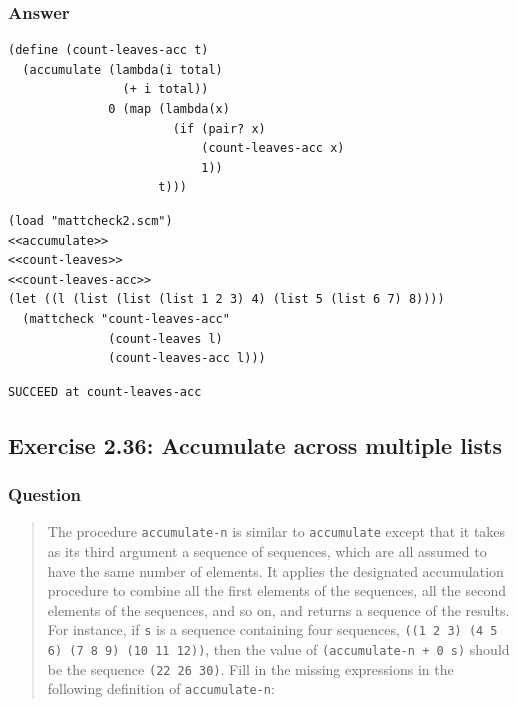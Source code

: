 \documentclass[final,fleqn,titlepage,twoside]{article}
\begin{document}
\subsubsection{Answer}
\label{sec:org5166be9}
\begin{verbatim}
(define (count-leaves-acc t)
  (accumulate (lambda(i total)
                (+ i total))
              0 (map (lambda(x)
                       (if (pair? x)
                           (count-leaves-acc x)
                           1))
                     t)))
\end{verbatim}
\begin{verbatim}
(load "mattcheck2.scm")
<<accumulate>>
<<count-leaves>>
<<count-leaves-acc>>
(let ((l (list (list (list 1 2 3) 4) (list 5 (list 6 7) 8))))
  (mattcheck "count-leaves-acc"
              (count-leaves l)
              (count-leaves-acc l)))
\end{verbatim}

\begin{verbatim}
SUCCEED at count-leaves-acc
\end{verbatim}

\subsection{Exercise 2.36: Accumulate across multiple lists}
\label{sec:org798a794}
\subsubsection{Question}
\label{sec:org4773293}
\begin{quote}
The procedure \texttt{accumulate-n} is similar to \texttt{accumulate}
except that it takes as its third argument a sequence of sequences, which are
all assumed to have the same number of elements. It applies the designated
accumulation procedure to combine all the first elements of the sequences, all
the second elements of the sequences, and so on, and returns a sequence of the
results. For instance, if \texttt{s} is a sequence containing four sequences,
\texttt{((1 2 3) (4 5 6) (7 8 9) (10 11 12))}, then the value of
\texttt{(accumulate-n + 0 s)} should be the sequence \texttt{(22 26 30)}.
Fill in the missing expressions in the following definition of
\texttt{accumulate-n}:
\end{quote}
\end{document}
